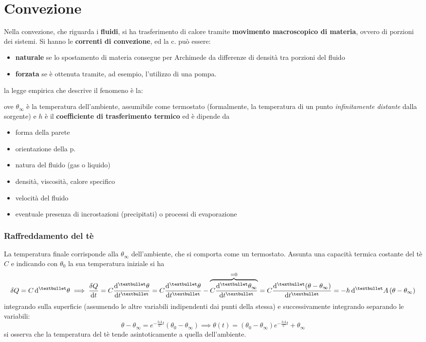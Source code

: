 \documentclass[10pt, oneside]{book}
\newcommand{\lawbox}[2]{\begin{center}
\framebox{
\parbox{\linewidth}{
\vspace{0.3cm}
\textbf{#1} \hfill $\displaystyle #2$
\vspace{0.3cm}
}
}
\end{center}}
\newcommand{\ds}{\displaystyle}
\begin{document}
\section{Convezione}
Nella convezione, che riguarda i \textbf{fluidi}, si ha trasferimento di calore tramite \textbf{movimento macroscopico di materia}, ovvero di porzioni dei sistemi. Si hanno le \textbf{correnti di convezione}, ed la c. può essere:
\begin{itemize}
\item \textbf{naturale} se lo spostamento di materia consegue per Archimede da differenze di densità tra porzioni del fluido
\item \textbf{forzata} se è ottenuta tramite, ad esempio, l'utilizzo di una pompa.
\end{itemize}
la legge empirica che descrive il fenomeno è la:
\lawbox{Legge (empirica) di Newton}{\frac{\delta Q}{\mathrm{d} t} = h \dd[•]{A} (\theta_0 - \theta_\infty)}
ove $\theta_\infty$ è la temperatura dell'ambiente, assumibile come termostato (formalmente, la temperatura di un punto \textit{infinitamente distante} dalla sorgente) e $h$ è il \textbf{coefficiente di trasferimento termico} ed è dipende da
\begin{itemize}
\item forma della parete
\item orientazione della p.
\item natura del fluido (gas o liquido)
\item densità, viscosità, calore specifico
\item velocità del fluido
\item eventuale presenza di incrostazioni (precipitati) o processi di evaporazione
\end{itemize}

\subsubsection*{Raffreddamento del tè}
La temperatura finale corrisponde alla $\theta_\infty$ dell'ambiente, che si comporta come un termostato. Assunta una capacità termica costante del tè $C$ e indicando con $\theta_0$ la sua temperatura iniziale si ha
\[\delta Q = C \dd[•]{\theta} \implies \frac{\delta Q}{\mathrm{d} t} = C \dv[•]{\theta}{t} = C \dv[•]{\theta}{t} - \overbrace{C \dv[•]{\theta_{\infty}}{t}}^{= 0} = C \dv[•]{(\theta - \theta_\infty)}{t}  = - h \dd[•]{A} (\theta - \theta_\infty)\]
integrando sulla superficie (assumendo le altre variabili indipendenti dai punti della stessa) e successivamente integrando separando le variabili:
\[\theta - \theta_\infty = e^{- \frac{hA}{C}t}(\theta_0 - \theta_\infty) \implies \boxed{\theta(t) = (\theta_0 - \theta_\infty) e^{\ds - \frac{hA}{C}t} + \theta_\infty}\]
si osserva che la temperatura del tè tende asintoticamente a quella dell'ambiente.
\end{document}
